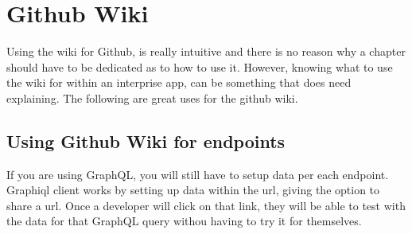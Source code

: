 \maketitle{}
\section{ Github Wiki }

Using the wiki for Github, is really intuitive and there is no reason why a
chapter should have to be dedicated as to how to use it. However, knowing what
to use the wiki for within an interprise app, can be something that does need
explaining. The following are great uses for the github wiki.

\subsection{ Using Github Wiki for endpoints }
If you are using GraphQL, you will still have to setup data per each endpoint.
Graphiql client works by setting up data within the url, giving the option to
share a url. Once a developer will click on that link, they will be able to
test with the data for that GraphQL query withou having to try it for
themselves.
